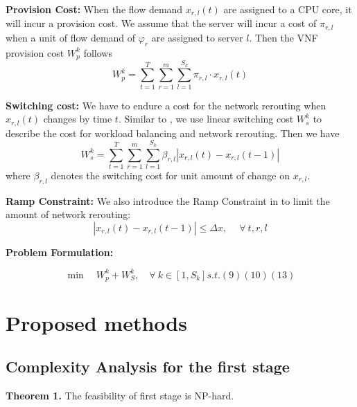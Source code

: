 \documentclass{acmtog}
\begin{document}
\noindent\textbf{Provision Cost: }When the flow demand $x_{r,l}(t)$ are assigned to a CPU core, it will incur a provision cost.
We assume that the server will incur a cost of $\pi_{r,l}$ when a unit of flow demand of $\varphi_r$ are assigned to server $l$. Then the VNF provision cost $W_p^k$ follows\\
\begin{equation}
  W_p^k=\sum_{t=1}^T \sum_{r=1}^m \sum_{l=1}^{S_k} \pi_{r,l}\cdot x_{r,l}(t)
\end{equation}

\noindent\textbf{Switching cost: }We have to endure a cost for the network rerouting when $x_{r,l}(t)$ changes by time $t$. Similar to \cite{shicompetitive}, we use linear switching cost $W_s^k$ to describe the cost for workload balancing and network rerouting. Then we have
\begin{equation}
  W_s^k=\sum_{t=1}^T \sum_{r=1}^m \sum_{l=1}^{S_k} \beta_{r,l}|x_{r,l}(t)-x_{r,l}(t-1)|
\end{equation}
where $\beta_{r,l}$ denotes the switching cost for unit amount of change on $x_{r,l}$. 


\noindent\textbf{Ramp Constraint: }We also introduce the Ramp Constraint in \cite{c3} to limit the amount of network rerouting:
\begin{equation}\label{RampConstraint}
  |x_{r,l}(t)-x_{r,l}(t-1)|\leqslant \Delta x,~\quad \forall~ t,r,l
\end{equation}

\noindent\textbf{Problem Formulation: } 

\begin{center}
    \begin{equation}
         \min \quad W_p^k+W_S^k, \quad \forall ~k \in [1,S_k] s.t. (9)(10)(13)
    \end{equation}
\end{center}









\section{Proposed methods}
\subsection{Complexity Analysis for the first stage}
\noindent\textbf{Theorem 1.} The feasibility of first stage is NP-hard.
\end{document}
